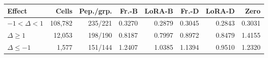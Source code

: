 {\small\setlength{\tabcolsep}{3.5pt}
\begin{tabularx}{\textwidth}{Xrrrrrrr}
\toprule
Effect & Cells & Pep./grp. & Fr.-B & LoRA-B & Fr.-D & LoRA-D & Zero \\
\midrule
$-1<\Delta<1$ & 108,782 & 235/221 & 0.3270 & 0.2879 & 0.3045 & 0.2843 & 0.3031 \\
$\Delta\ge1$ & 12,053 & 198/190 & 0.8187 & 0.7997 & 0.8972 & 0.8479 & 1.4155 \\
$\Delta\le-1$ & 1,577 & 151/144 & 1.2407 & 1.0385 & 1.1394 & 0.9510 & 1.2320 \\
\bottomrule
\end{tabularx}}
